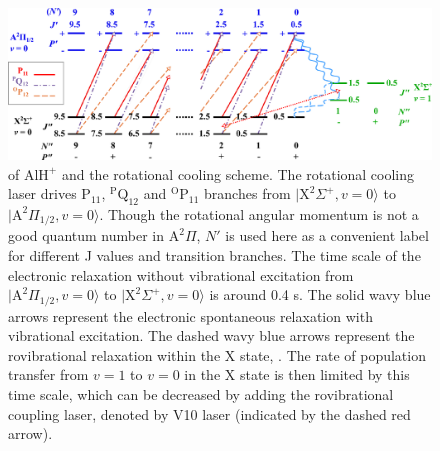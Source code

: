 \documentclass[twoside,twocolumn,9pt]{article}
\begin{document}


\begin{figure}[!htp]
 \centering
 \includegraphics[width=14cm]{level_diagram_parity}
 \caption{ of $\mathrm{AlH}^+$ and the rotational cooling scheme. The rotational cooling laser drives $\mathrm{P_{11}}$, $\mathrm{^PQ_{12}}$ and $\mathrm{^OP_{11}}$ branches from $\lvert \mathrm{X}^2\Sigma^+, v=0\rangle$ to $\lvert \mathrm{A}^2\Pi_{1/2}, v=0\rangle$. Though the rotational angular momentum is not a good quantum number in $\mathrm{A}^{2}\Pi$, $N'$ is used here as a convenient label for different J values and transition branches. The time scale of the electronic relaxation without vibrational excitation from $\lvert \mathrm{A}^2\Pi_{1/2}, v=0\rangle$ to $\lvert \mathrm{X}^2\Sigma^+, v=0\rangle$ is around 0.4 \si{\micro}s. The solid wavy blue arrows represent the electronic spontaneous relaxation with vibrational excitation. The dashed wavy blue arrows represent the rovibrational relaxation within the $\mathrm{X}$ state, . The rate of population transfer from $v=1$ to $v=0$ in the $\mathrm{X}$ state is then limited by this time scale, which can be decreased by adding the rovibrational coupling laser, denoted by V10 laser (indicated by the dashed red arrow).}
 \label{level_diagram_parity}
\end{figure}
\end{document}
